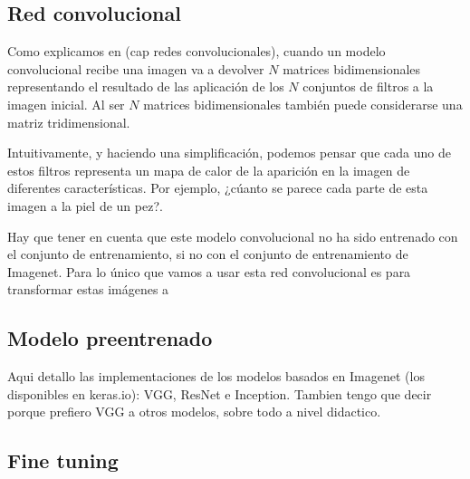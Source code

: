 \subsection{Red convolucional}

Como explicamos en (cap redes convolucionales), cuando un modelo convolucional recibe una imagen va a devolver $N$ matrices bidimensionales representando el resultado de las aplicación de los $N$ conjuntos de filtros a la imagen inicial. Al ser $N$ matrices bidimensionales también puede considerarse una matriz tridimensional.

Intuitivamente, y haciendo una simplificación, podemos pensar que cada uno de estos filtros representa un mapa de calor de la aparición en la imagen de diferentes características. Por ejemplo, ¿cúanto se parece cada parte de esta imagen a la piel de un pez?.

Hay que tener en cuenta que este modelo convolucional no ha sido entrenado con el conjunto de entrenamiento, si no con el conjunto de entrenamiento de Imagenet. Para lo único que vamos a usar esta red convolucional es para transformar estas imágenes a 

\subsection{Modelo preentrenado}

Aqui detallo las implementaciones de los modelos basados en Imagenet (los
disponibles en keras.io): VGG, ResNet e Inception. Tambien tengo que decir
porque prefiero VGG a otros modelos, sobre todo a nivel didactico.

\subsection{Fine tuning}

